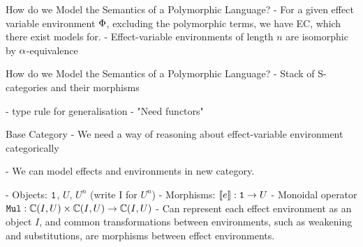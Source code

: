 \documentclass{beamer}
\newcommand\script[1]{}
\begin{document}
\begin{frame}{How do we Model the Semantics of a Polymorphic Language?}
    - For a given effect variable environment $\P$, excluding the polymorphic terms, we have EC, which there exist models for.
    - Effect-variable environments of length $n$ are isomorphic by $\a$-equivalence

    \script{
        - If we fix the effect-variable environment, and disallow polymorphic terms, then PEC terms become EC terms for a particular instantiation.
        - We already know how to build models for PEC
        -It's also the case that effect-variable environments can type the same set of relations, upto alpha equivalence.
        - So there is a countable set of these EC instantiations
    }
\end{frame}

\begin{frame}{How do we Model the Semantics of a Polymorphic Language?}
    - Stack of S-categories and their morphisms

    - type rule for generalisation
    - "Need functors"

\script{
    - So we can imagine a stack of these S-Categories, called fibres
    - In order to model polymorphism, we need to have ways of moving morphisms between these fibres - we need functors
}
\end{frame}

\begin{frame}{Base Category}
    - We need a way of reasoning about effect-variable environment categorically

    - We can model effects and environments in new category.

    - Objects: $\1$, $U$, $U^n$ (write I for $U^n$)
    - Morphisms: $\deno{e}: \1\rightarrow U$
    - Monoidal operator $\Mul: \ciu\times\ciu\rightarrow\ciu$
    - Can represent each effect environment as an object $I$, and common transformations between environments, such as weakening and substitutions, are morphisms between effect environments.

    \script{
        - So we need a way of reasoning about the transformations of effect-variable environments in a category theoretic manner
        - To do this, we need a base category, containing a terminal object, an object $U$ representing the kind of effects, and finite products on $U$ 
        - $U^n$ represents the effect-variable environment of length $n$. We'll now use $I$ to indicate this.
        
        - Since all the ground effects have morphisms in this category, we can construct morphisms for substitutions and weakenings of the effect environment.
    }
\end{frame}
\end{document}
